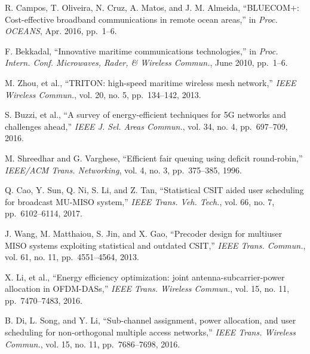 \documentclass[conference]{IEEEtran}
\begin{document}
 
 \begin{thebibliography}{10}
  
  
  
  R. Campos, T. Oliveira, N. Cruz, A. Matos, and J. M. Almeida,
  ``BLUECOM+: Cost-effective broadband communications in remote ocean areas,'' in
  \emph{Proc. OCEANS}, Apr. 2016, pp.~1--6.
  
  F. Bekkadal, ``Innovative maritime communications technologies,'' in
  \emph{Proc. Intern. Conf. Microwaves, Rader, \& Wireless Commun.}, June 2010, pp.~1--6.
  
  M. Zhou, et al., ``TRITON: high-speed maritime wireless mesh network,''
  \emph{IEEE Wireless Commun.}, vol. 20, no. 5, pp.~134--142, 2013.
  
  
  S. Buzzi, et al., ``A survey of energy-efficient techniques for 5G networks and challenges ahead,''
  \emph{IEEE J. Sel. Areas Commun.}, vol. 34, no. 4, pp.~697--709, 2016.
  
  M. Shreedhar and G. Varghese, ``Efficient fair queuing using deficit round-robin,''
  \emph{IEEE/ACM Trans. Networking}, vol. 4, no. 3, pp.~375--385, 1996.
  
  Q. Cao, Y. Sun, Q. Ni, S. Li, and Z. Tan, ``Statistical CSIT aided user scheduling for broadcast MU-MISO system,''
  \emph{IEEE Trans. Veh. Tech.}, vol. 66, no. 7, pp.~6102--6114, 2017.
  
  J. Wang, M. Matthaiou, S. Jin, and X. Gao, ``Precoder design for multiuser MISO systems exploiting statistical and outdated CSIT,''
  \emph{IEEE Trans. Commun.}, vol. 61, no. 11, pp.~4551--4564, 2013.
  
  X. Li, et al., ``Energy efficiency optimization: joint antenna-subcarrier-power allocation in OFDM-DASs,''
  \emph{IEEE Trans. Wireless Commun.}, vol. 15, no. 11, pp.~7470--7483, 2016.
  
  B. Di, L. Song, and Y. Li, ``Sub-channel assignment, power allocation, and user scheduling for non-orthogonal multiple access networks,''
  \emph{IEEE Trans. Wireless Commun.}, vol. 15, no. 11, pp.~7686--7698, 2016.
  

\end{thebibliography}
\end{document}
